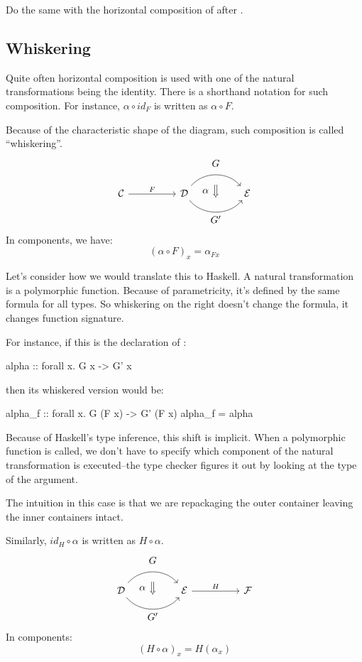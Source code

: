 \documentclass[DaoFP]{subfiles}
\begin{document}
\begin{exercise}
Do the same with the horizontal composition of  after . 
\end{exercise}

\subsection{Whiskering}

Quite often horizontal composition is used with one of the natural transformations being the identity. There is a shorthand notation for such composition. For instance, $\alpha \circ id_F$ is written as $\alpha \circ F$. 

Because of the characteristic shape of the diagram, such composition is called ``whiskering''.
\[
\begin{tikzcd}[column sep=huge]
\mathcal{C}
 \arrow[r, "F"]
 &
\mathcal{D}
  \arrow[bend left=50]{r}[name=U1, label=above:$G$]{}
  \arrow[bend right=50]{r}[name=D1, label=below:$G'$]{} 
 &
\mathcal{E}
  \arrow[shorten <=10pt,shorten >=10pt,Rightarrow,to path={(U1) -- node[label=left:$\alpha$] {} (D1)}]{}
\end{tikzcd}
\]
In components, we have:
\[ (\alpha \circ F)_x = \alpha_{F x} \]

Let's consider how we would translate this to Haskell. A natural transformation is a polymorphic function. Because of parametricity, it's defined by the same formula for all types. So whiskering on the right doesn't change the formula, it changes function signature. 

For instance, if this is the declaration of :
\begin{haskell}
alpha :: forall x. G x -> G' x
\end{haskell}
then its whiskered version would be:
\begin{haskell}
alpha_f :: forall x. G (F x) -> G' (F x)
alpha_f = alpha
\end{haskell}
Because of Haskell's type inference, this shift is implicit. When a polymorphic function is called, we don't have to specify which component of the natural transformation is executed--the type checker figures it out by looking at the type of the argument. 

The intuition in this case is that we are repackaging the outer container leaving the inner containers intact.

Similarly, $id_H \circ \alpha$ is written as $H \circ \alpha$.
\[
\begin{tikzcd}[column sep=huge]
\mathcal{D}
  \arrow[bend left=50]{r}[name=U, label=above:$G$]{}
  \arrow[bend right=50]{r}[name=D, label=below:$G'$]{} 
 &
\mathcal{E}
\arrow[r, "H"]
&
\mathcal{F}
  \arrow[shorten <=10pt,shorten >=10pt,Rightarrow,to path={(U) -- node[label=left:$\alpha$] {} (D)}]{}
\end{tikzcd}
\]
In components:
\[(H \circ \alpha)_x = H (\alpha_x) \]
\end{document}
